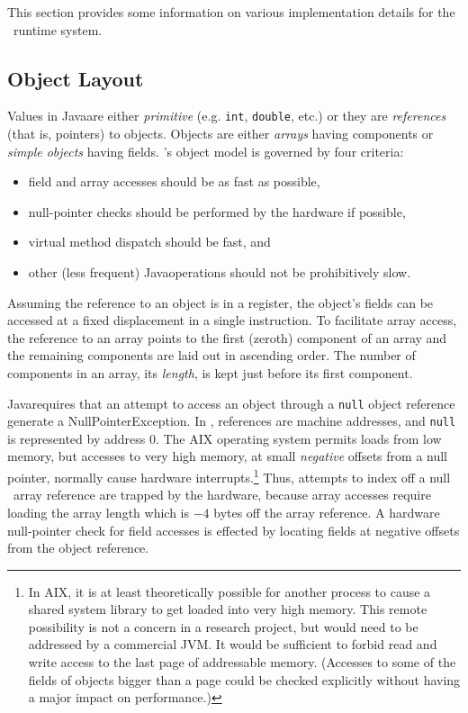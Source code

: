 This section provides some information on various
implementation details for the \jp\ runtime system.

\subsection{Object Layout} \label{sssec:objects}
Values in Java\trademark are either {\em primitive} (e.g. {\tt int},
{\tt double}, etc.)  or they are {\em references} (that is, pointers) to
objects.  Objects are either {\em arrays} having components or {\em
simple objects} having fields.  \jp's object model is governed by four
criteria: 
\begin{itemize}
\item{}
field and array accesses should be as fast as possible,
\item{}
null-pointer checks should be performed by the hardware if possible, 
\item{}
virtual method dispatch should be fast, and 
\item{}
other (less frequent) Java\trademark operations  should not be prohibitively slow.
\end{itemize}

Assuming the reference to an object is in a register, the object's
fields can be accessed at a fixed displacement in a single
instruction.  To facilitate array access, the reference to an array
points to the first (zeroth) component of an array and the remaining
components are laid out in ascending order.  The number of components
in an array, its {\em length}, is kept just before its first
component.

Java\trademark requires that an attempt to access an object through a {\tt null}
object reference generate a NullPointerException.  In \jp, references
are machine addresses, and {\tt null} is represented by address $0$.
The AIX operating system permits loads from low memory, but accesses
to very high memory, at small {\em negative} offsets from a null
pointer, normally cause hardware interrupts.\footnote{In AIX, it is at
least theoretically possible for another process to cause a shared
system library to get loaded into very high memory.  This remote
possibility is not a concern in a research project, but would need to
be addressed by a commercial JVM.  It would be sufficient to forbid
read and write access to the last page of addressable memory.
(Accesses to some of the fields of objects bigger than a page could be
checked explicitly without having a major impact on performance.)}
Thus, attempts to index off a null \jp\ array reference are trapped by
the hardware, because array accesses require loading the array length
which is $-4$ bytes off the array reference.  A hardware null-pointer
check for field accesses is effected by locating fields at negative
offsets from the object reference.

